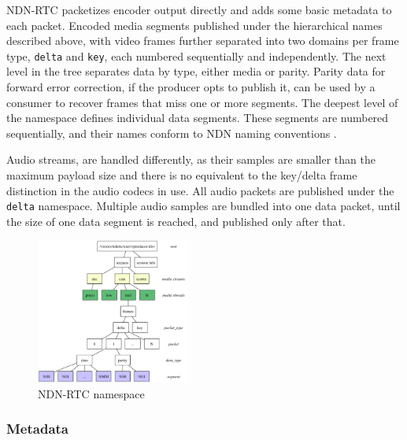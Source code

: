 \documentclass{icn/sig-alternate-2012} %
\newcommand{\ndnrtcName}{NDN-RTC} %
\begin{document}

\ndnrtcName{} packetizes encoder output directly and adds some basic metadata to each packet. Encoded media segments published under the hierarchical names described above, with video frames further separated into two domains per frame type, \texttt{delta} and \texttt{key}, each numbered sequentially and independently.  The next level in the tree separates data by type, either media or parity. Parity data for forward error correction, if the producer opts to publish it, can be used by a consumer to recover frames that miss one or more segments. 
The deepest level of the namespace defines individual data segments. These segments are numbered sequentially, and their names conform to NDN naming conventions \cite{ndnnaming}.

Audio streams, are handled differently, as their samples are smaller than the maximum payload size and there is no equivalent to the key/delta frame distinction in the audio codecs in use. All audio packets are published under the \texttt{delta} namespace. Multiple audio samples are bundled into one data packet, until the size of one data segment is reached, and published only after that.

\begin{figure}[t!]
\centering
\includegraphics[width=0.45\textwidth]{namespace}
\caption{\ndnrtcName{} namespace}
\label{fig:namespace}
\end{figure}

\subsubsection{Metadata} 
\end{document}
